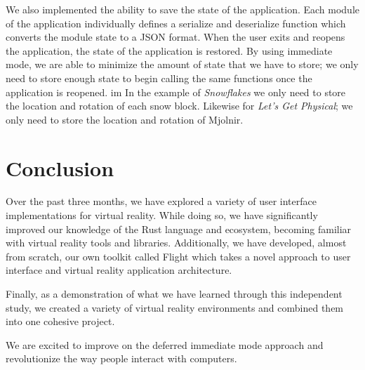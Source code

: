 \documentclass[conference,12pt]{IEEEtran}
\begin{document}
We also implemented the ability to save the state of the application. Each
module of the application individually defines a serialize and deserialize
function which converts the module state to a JSON format. When the user exits
and reopens the application, the state of the application is restored. By using
immediate mode, we are able to minimize the amount of state that we have to
store; we only need to store enough state to begin calling the same functions
once the application is reopened.
im
In the example of \textit{Snowflakes} we only need to store the location and
rotation of each snow block. Likewise for \textit{Let's Get Physical}; we only
need to store the location and rotation of Mjolnir.

\section{Conclusion}\label{sec:conclusion}

Over the past three months, we have explored a variety of user interface
implementations for virtual reality. While doing so, we have significantly
improved our knowledge of the Rust language and ecosystem, becoming familiar
with virtual reality tools and libraries. Additionally, we have developed,
almost from scratch, our own toolkit called Flight which takes a novel approach
to user interface and virtual reality application architecture.

Finally, as a demonstration of what we have learned through this independent
study, we created a variety of virtual reality environments and combined them
into one cohesive project.

We are excited to improve on the deferred immediate mode approach and
revolutionize the way people interact with computers.

{\printbibliography}
\end{document}
